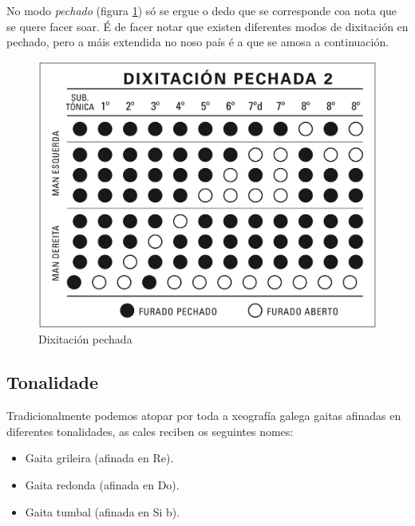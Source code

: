 No modo \textit{pechado}
 (figura \ref{figura:PabloCarpinteroDixitacionPechada}) só se ergue o dedo que
 se corresponde coa nota que se quere facer soar. É de facer notar que existen
 diferentes modos de dixitación en pechado, pero a máis extendida no noso país
 é a que se amosa a continuación. \\

 \begin{figure}[htbp]
  \centering
  \includegraphics[scale=0.2,keepaspectratio=true]{./imagenes/pablo-carpintero-dixitacion-pechada-2.jpg}
  \caption[Dixitación pechada]{Dixitación pechada \cite{PabloCarpintero}}
  \label{figura:PabloCarpinteroDixitacionPechada}
 \end{figure}

 \subsection{Tonalidade}

 Tradicionalmente podemos atopar por toda a xeografía galega gaitas afinadas en
 diferentes tonalidades, as cales reciben os seguintes nomes:

 \begin{itemize}
  \item Gaita grileira (afinada en Re).
  \item Gaita redonda (afinada en Do).
  \item Gaita tumbal (afinada en Si b).
 \end{itemize}


